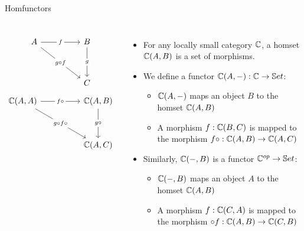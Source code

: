 \begin{frame}[fragile]{Homfunctors}
	\begin{columns}
		\[\begin{tikzcd}
			A && B \\
			\\
			&& C
			\arrow["f"{description}, from=1-1, to=1-3]
			\arrow["{g \circ f}"{description}, from=1-1, to=3-3]
			\arrow["g"{description}, from=1-3, to=3-3]
		\end{tikzcd}\]
		\[\begin{tikzcd}
			{\bC(A,A)} && {\bC(A,B)}\\
			\\
			&& {\bC(A,C)}
			\arrow["{f \circ}"{description}, from=1-1, to=1-3]
			\arrow["{g \circ f \circ}"{description}, from=1-1, to=3-3]
			\arrow["{g \circ}"{description}, from=1-3, to=3-3]
		\end{tikzcd}\]
		\begin{itemize}
			\item For any locally small category $\mathbb{C}$, a homset $\mathbb{C}(A,B)$ is a set of morphisms.
			\pause\item We define a functor $\mathbb{C}(A, -) : \mathbb{C} \to \mathbb{S}et$:
			\begin{itemize}
				\pause\item $\mathbb{C}(A, -)$ maps an object $B$ to the homset $\mathbb{C}(A,B)$
				\pause\item A morphism $f : \mathbb{C}(B,C)$ is mapped to the morphism $f \circ : \mathbb{C}(A,B) \to \mathbb{C}(A,C)$
			\end{itemize}
			\pause\item Similarly, $\mathbb{C}(-, B)$ is a functor $\mathbb{C}^{op} \to \mathbb{S}et$:
			\begin{itemize}
				\pause\item $\mathbb{C}(-, B)$ maps an object $A$ to the homset $\mathbb{C}(A,B)$
				\pause\item A morphism $f : \mathbb{C}(C,A)$ is mapped to the morphism $\circ f: \mathbb{C}(A,B) \to \mathbb{C}(C,B)$
			\end{itemize}
		\end{itemize}
	\end{columns}
\end{frame}

